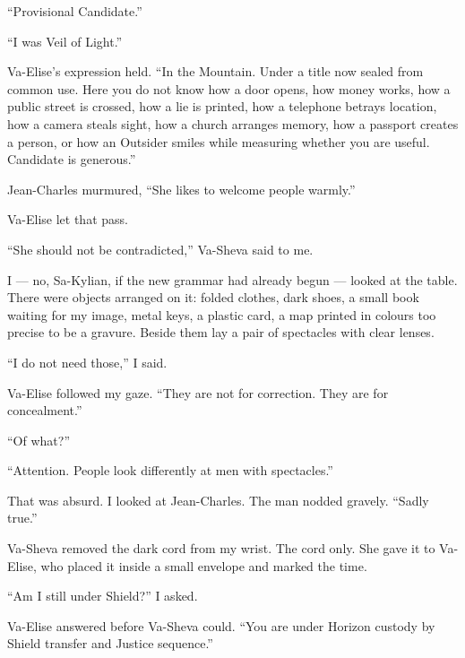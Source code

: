 ``Provisional Candidate.''\par

``I was Veil of Light.''\par

Va-Elise's expression held. ``In the Mountain. Under a title now sealed from common use. Here you do not know how a door opens, how money works, how a public street is crossed, how a lie is printed, how a telephone betrays location, how a camera steals sight, how a church arranges memory, how a passport creates a person, or how an Outsider smiles while measuring whether you are useful. Candidate is generous.''\par

Jean-Charles murmured, ``She likes to welcome people warmly.''\par

Va-Elise let that pass.\par

``She should not be contradicted,'' Va-Sheva said to me.\par

I --- no, Sa-Kylian, if the new grammar had already begun --- looked at the table. There were objects arranged on it: folded clothes, dark shoes, a small book waiting for my image, metal keys, a plastic card, a map printed in colours too precise to be a gravure. Beside them lay a pair of spectacles with clear lenses.\par

``I do not need those,'' I said.\par

Va-Elise followed my gaze. ``They are not for correction. They are for concealment.''\par

``Of what?''\par

``Attention. People look differently at men with spectacles.''\par

That was absurd. I looked at Jean-Charles. The man nodded gravely. ``Sadly true.''\par

Va-Sheva removed the dark cord from my wrist. The cord only. She gave it to Va-Elise, who placed it inside a small envelope and marked the time.\par

``Am I still under Shield?'' I asked.\par

Va-Elise answered before Va-Sheva could. ``You are under Horizon custody by Shield transfer and Justice sequence.''\par

